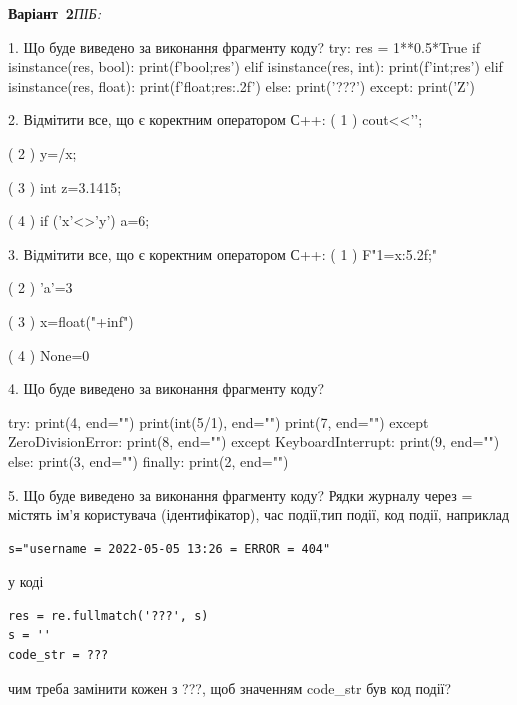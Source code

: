 \documentclass[11pt]{article}
\begin{document}
\textbf{Варіант \No\,2}\hfill \textit{ПІБ:}\,\underline{\hspace{60mm}}
\vspace{4mm}

1. Що буде виведено за виконання фрагменту коду?
try:
    res = 1**0.5*True
    if isinstance(res, bool):
        print(f'bool;{res}')
    elif isinstance(res, int):
        print(f'int;{res}')
    elif isinstance(res, float):
        print(f'float;{res:.2f}')
    else:
        print('???')
except:
    print('Z')

2. %
Відмітити все, що є коректним оператором С++:
( 1 ) cout<<'\n';

( 2 ) y=/x;

( 3 ) int z=3.1415;

( 4 ) if ('x'<>'y') a=6;

3. %
Відмітити все, що є коректним оператором С++:
( 1 ) F"1={x:5.2f};"

( 2 ) 'a'=3

( 3 ) x=float("+inf")

( 4 ) None=0

4. Що буде виведено за виконання фрагменту коду?

try:
    print(4, end="")
    print(int(5/1), end="")
    print(7, end="")
except ZeroDivisionError: 
    print(8, end="")
except KeyboardInterrupt: 
    print(9, end="")
else:
    print(3, end="")
finally:
    print(2, end="")


5. Що буде виведено за виконання фрагменту коду?
Рядки журналу через = містять ім'я користувача (ідентифікатор), час події,тип події, код події, наприклад
\begin{verbatim}
s="username = 2022-05-05 13:26 = ERROR = 404"
\end{verbatim}
у коді 
\begin{verbatim}
res = re.fullmatch('???', s) 
s = ''
code_str = ??? 
\end{verbatim}
чим треба замінити кожен з ???, щоб значенням code\_str був код події? 








\newpage
\end{document}
